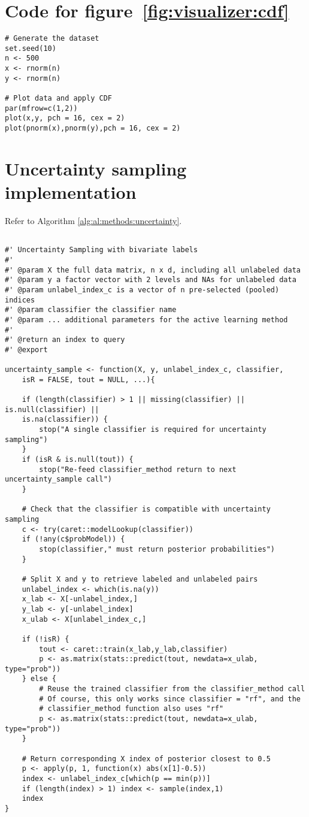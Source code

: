 \section{Code for figure~\ref{fig:visualizer:cdf}}
\label{sec:appendicies:cdf}
{
\begin{lstlisting}
# Generate the dataset
set.seed(10)
n <- 500
x <- rnorm(n)
y <- rnorm(n)

# Plot data and apply CDF
par(mfrow=c(1,2))
plot(x,y, pch = 16, cex = 2)
plot(pnorm(x),pnorm(y),pch = 16, cex = 2)
\end{lstlisting}
}




\section{Uncertainty sampling implementation}
\label{sec:appendicies:al:uncertainty}

Refer to Algorithm \ref{alg:al:methods:uncertainty}. 
{
\begin{lstlisting}

#' Uncertainty Sampling with bivariate labels
#'
#' @param X the full data matrix, n x d, including all unlabeled data
#' @param y a factor vector with 2 levels and NAs for unlabeled data
#' @param unlabel_index_c is a vector of n pre-selected (pooled) indices
#' @param classifier the classifier name
#' @param ... additional parameters for the active learning method
#'
#' @return an index to query
#' @export

uncertainty_sample <- function(X, y, unlabel_index_c, classifier,
	isR = FALSE, tout = NULL, ...){

	if (length(classifier) > 1 || missing(classifier) || is.null(classifier) || 
	is.na(classifier)) {
		stop("A single classifier is required for uncertainty sampling")
	}
	if (isR & is.null(tout)) {
		stop("Re-feed classifier_method return to next uncertainty_sample call")
	}	
	
	# Check that the classifier is compatible with uncertainty sampling
	c <- try(caret::modelLookup(classifier))
	if (!any(c$probModel)) {
		stop(classifier," must return posterior probabilities")
	}
	
	# Split X and y to retrieve labeled and unlabeled pairs
	unlabel_index <- which(is.na(y))
	x_lab <- X[-unlabel_index,]
	y_lab <- y[-unlabel_index]
	x_ulab <- X[unlabel_index_c,]
	
	if (!isR) {
		tout <- caret::train(x_lab,y_lab,classifier)
		p <- as.matrix(stats::predict(tout, newdata=x_ulab, type="prob"))
	} else {
		# Reuse the trained classifier from the classifier_method call
		# Of course, this only works since classifier = "rf", and the
		# classifier_method function also uses "rf"
		p <- as.matrix(stats::predict(tout, newdata=x_ulab, type="prob"))
	}
	
	# Return corresponding X index of posterior closest to 0.5
	p <- apply(p, 1, function(x) abs(x[1]-0.5))
	index <- unlabel_index_c[which(p == min(p))]
	if (length(index) > 1) index <- sample(index,1)
	index
}
\end{lstlisting}
}

